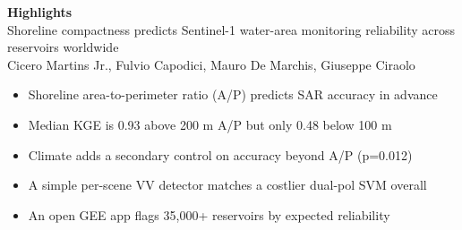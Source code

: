 \documentclass[11pt]{article}
\begin{document}
\begin{center}
{\large\bfseries Highlights}\\[0.3em]
Shoreline compactness predicts Sentinel-1 water-area monitoring reliability
across reservoirs worldwide\\[0.2em]
Cicero Martins Jr., Fulvio Capodici, Mauro De Marchis, Giuseppe Ciraolo
\end{center}

\vspace{0.8cm}

\begin{itemize}
  \item Shoreline area-to-perimeter ratio (A/P) predicts SAR accuracy in advance
  \item Median KGE is 0.93 above 200 m A/P but only 0.48 below 100 m
  \item Climate adds a secondary control on accuracy beyond A/P (p=0.012)
  \item A simple per-scene VV detector matches a costlier dual-pol SVM overall
  \item An open GEE app flags 35,000+ reservoirs by expected reliability
\end{itemize}
\end{document}
